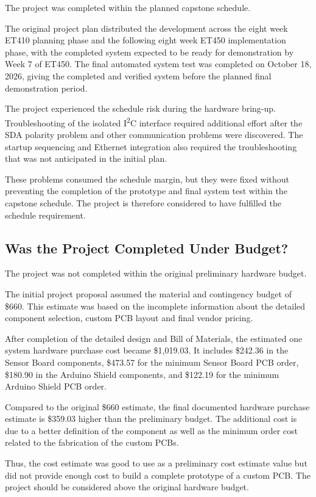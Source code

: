 The project was completed within the planned capstone schedule.

The original project plan distributed the development across the eight week ET410 planning phase and the following eight week ET450 implementation phase, with the completed system expected to be ready for demonstration by Week 7 of ET450. The final automated system test was completed on October 18, 2026, giving the completed and verified system before the planned final demonstration period.

The project experienced the schedule risk during the hardware bring-up. Troubleshooting of the isolated I\textsuperscript{2}C interface required additional effort after the SDA polarity problem and other communication problems were discovered. The startup sequencing and Ethernet integration also required the troubleshooting that was not anticipated in the initial plan.

These problems consumed the schedule margin, but they were fixed without preventing the completion of the prototype and final system test within the capstone schedule. The project is therefore considered to have fulfilled the schedule requirement.

\subsection{Was the Project Completed Under Budget?}

The project was not completed within the original preliminary hardware budget.

The initial project proposal assumed the material and contingency budget of \$660. This estimate was based on the incomplete information about the detailed component selection, custom PCB layout and final vendor pricing.

After completion of the detailed design and Bill of Materials, the estimated one system hardware purchase cost became \$1,019.03. It includes \$242.36 in the Sensor Board components, \$473.57 for the minimum Sensor Board PCB order, \$180.90 in the Arduino Shield components, and \$122.19 for the minimum Arduino Shield PCB order.

Compared to the original \$660 estimate, the final documented hardware purchase estimate is \$359.03 higher than the preliminary budget. The additional cost is due to a better definition of the component as well as the minimum order cost related to the fabrication of the custom PCBs.

Thus, the cost estimate was good to use as a preliminary cost estimate value but did not provide enough cost to build a complete prototype of a custom PCB. The project should be considered above the original hardware budget.

